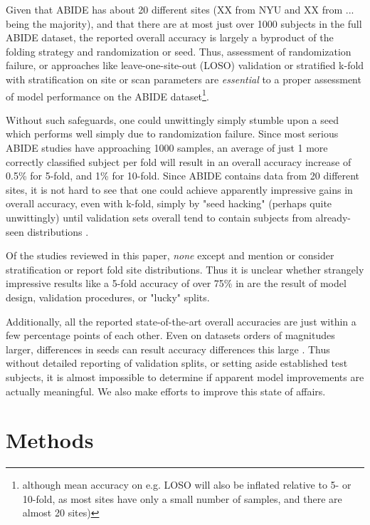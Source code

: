 \documentclass[10pt]{article}
\begin{document}
Given that ABIDE has about 20 different sites (XX from NYU and XX from ... being the majority), and
that there are at most just over 1000 subjects in the full ABIDE dataset, the reported overall
accuracy is largely a byproduct of the folding strategy and randomization or seed. Thus, assessment
of randomization failure, or approaches like leave-one-site-out (LOSO) validation or stratified
k-fold with stratification on site or scan parameters are \emph{essential} to a proper assessment of
model performance on the ABIDE dataset\footnote{although mean accuracy on e.g. LOSO will also be
inflated relative to 5- or 10-fold, as most sites have only a small number of samples, and there are
almost 20 sites)}.

Without such safeguards, one could unwittingly simply stumble upon a seed which performs well simply
due to randomization failure. Since most serious ABIDE studies have approaching 1000 samples, an
average of just 1 more correctly classified subject per fold will result in an overall accuracy
increase of 0.5\% for 5-fold, and 1\% for 10-fold. Since ABIDE contains data from 20 different
sites, it is not hard to see that one could achieve apparently impressive gains in overall accuracy,
even with k-fold, simply by "seed hacking" (perhaps quite unwittingly) until validation sets overall
tend to contain subjects from already-seen distributions \citep{picardTorchManualSeed2021}.

Of the studies reviewed in this paper, \emph{none} except
\citet{ingalhalikarFunctionalConnectivitybasedPrediction2021} and
\citet{byeonArtificialNeuralNetwork2020} mention or consider stratification or report fold site
distributions. Thus it is unclear whether strangely impressive results like a 5-fold accuracy of
over 75\% in \citet{yangDeepNeuralNetwork2020} are the result of model design, validation
procedures, or "lucky" splits.

Additionally, all the reported state-of-the-art overall accuracies are just within a few percentage
points of each other. Even on datasets orders of magnitudes larger, differences in seeds can result
accuracy differences this large \citep{picardTorchManualSeed2021}. Thus without detailed reporting
of validation splits, or setting aside established test subjects, it is almost impossible to
determine if apparent model improvements are actually meaningful. We also make efforts to improve
this state of affairs.

\section{Methods}
\end{document}
